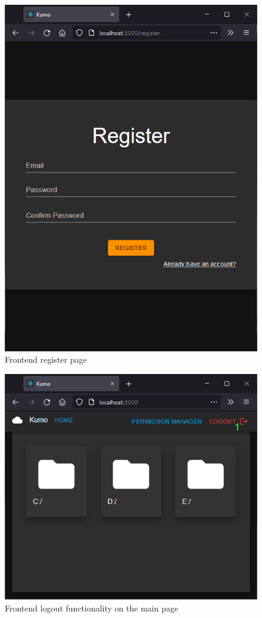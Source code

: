 \begin{figure}[htbp]
	\centering
		\includegraphics[scale=0.5]{./figures/chapter4/frontend_register.png}
	\caption{Frontend register page}
	\label{FigFrontendRegister}
\end{figure}

\begin{figure}[htbp]
	\centering
		\includegraphics[scale=0.5]{./figures/chapter4/frontend_logout.png}
	\caption{Frontend logout functionality on the main page}
	\label{FigFrontendLogout}
\end{figure}

